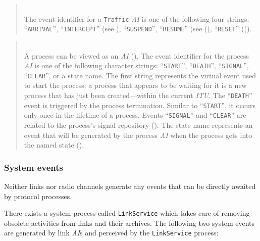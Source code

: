 \begin{quote}
\noindent{} \hspace{0in}\vspace{0.05in}\\
\noindent
The event identifier for a {\tt Traffic} {\em AI\/}
is one of the following four strings: ``{\tt ARRIVAL}'', ``{\tt INTERCEPT}''
(see ), ``{\tt SUSPEND}'',
``{\tt RESUME}'' (see (),
``{\tt RESET}'' (().
\end{quote}

\begin{quote}
\noindent{} \hspace{0in}\vspace{0.05in}\\
\noindent
A process can be viewed as an {\em AI\/} ().
The event identifier for the process {\em AI\/}
is one of the following character strings:
``{\tt START}'', ``{\tt DEATH}'', ``{\tt SIGNAL}'', ``{\tt CLEAR}'',
or a state name.
The first string represents the virtual event used to start the process:
a process that appears to be waiting for it is a new process that has just been
created---within the current {\em ITU}.
The ``{\tt DEATH}'' event is triggered by the process termination.
Similar to ``{\tt START}'', it occurs only once in the lifetime of a
process.
Events ``{\tt SIGNAL}'' and ``{\tt CLEAR}'' are related to the process's
signal repository ().
The state name represents an event that will be generated by the process
{\em AI\/} when the process gets into the named state ().
\end{quote}

\subsubsection*{System events}

\noindent
Neither links nor radio channels generate any events that can be directly
awaited by protocol processes.

There exists a system process called {\tt LinkService} which
takes care of removing obsolete activities from links
and their archives.
The following two system events are generated by link {\em AI\/}s and
perceived by the {\tt LinkService} process:

\medskip

